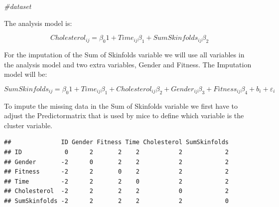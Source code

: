 \documentclass[]{book}
\newenvironment{Shaded}{\begin{snugshade}}{\end{snugshade}}
\newcommand{\KeywordTok}[1]{\textcolor[rgb]{0.13,0.29,0.53}{\textbf{#1}}}
\newcommand{\DataTypeTok}[1]{\textcolor[rgb]{0.13,0.29,0.53}{#1}}
\newcommand{\DecValTok}[1]{\textcolor[rgb]{0.00,0.00,0.81}{#1}}
\newcommand{\StringTok}[1]{\textcolor[rgb]{0.31,0.60,0.02}{#1}}
\newcommand{\CommentTok}[1]{\textcolor[rgb]{0.56,0.35,0.01}{\textit{#1}}}
\newcommand{\OperatorTok}[1]{\textcolor[rgb]{0.81,0.36,0.00}{\textbf{#1}}}
\newcommand{\NormalTok}[1]{#1}
\begin{document}
\begin{Shaded}
\begin{Highlighting}[]
\CommentTok{#dataset}
\end{Highlighting}
\end{Shaded}

The analysis model is:

\[Cholesterol_{ij} = \beta_0 1 + Time_{ij}\beta_1 + SumSkinfolds_{ij}\beta_2\]

For the imputation of the Sum of Skinfolds variable we will use all
variables in the analysis model and two extra variables, Gender and
Fitness. The Imputation model will be:

\[SumSkinfolds_{ij} = \beta_0 1 + Time_{ij}\beta_1 + Cholesterol_{ij}\beta_2 + Gender_{ij}\beta_3 + Fitness_{ij}\beta_4 + b_i + \varepsilon_i\]

To impute the missing data in the Sum of Skinfolds variable we first
have to adjust the Predictormatrix that is used by mice to define which
variable is the cluster variable.

\begin{Shaded}
\end{Shaded}

\begin{verbatim}
##              ID Gender Fitness Time Cholesterol SumSkinfolds
## ID            0      2       2    2           2            2
## Gender       -2      0       2    2           2            2
## Fitness      -2      2       0    2           2            2
## Time         -2      2       2    0           2            2
## Cholesterol  -2      2       2    2           0            2
## SumSkinfolds -2      2       2    2           2            0
\end{verbatim}
\end{document}
